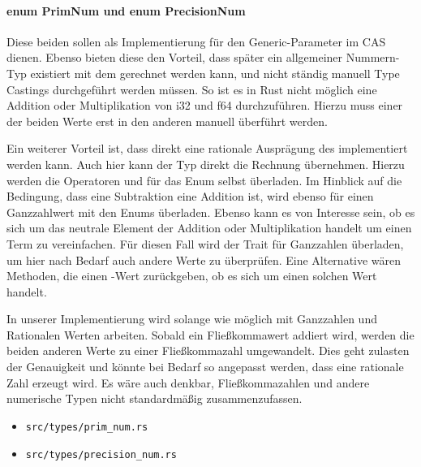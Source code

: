 \documentclass[11pt,a4paper, ngerman]{article}
\begin{document}
\paragraph{enum PrimNum und enum PrecisionNum} Diese beiden  sollen als Implementierung für den Generic-Parameter im CAS dienen. Ebenso bieten diese den Vorteil, dass später ein allgemeiner Nummern-Typ existiert mit dem gerechnet werden kann, und nicht ständig manuell Type Castings durchgeführt werden müssen. So ist es in Rust nicht möglich eine Addition oder Multiplikation von i32 und f64 durchzuführen. Hierzu muss einer der beiden Werte erst in den anderen manuell überführt werden.

Ein weiterer Vorteil ist, dass direkt eine rationale Ausprägung des  implementiert werden kann. Auch hier kann der Typ direkt die Rechnung übernehmen. Hierzu werden die Operatoren  und  für das Enum selbst überladen. Im Hinblick auf die Bedingung, dass eine Subtraktion eine Addition ist, wird ebenso  für einen Ganzzahlwert mit den Enums überladen. Ebenso kann es von Interesse sein, ob es sich um das neutrale Element der Addition oder Multiplikation handelt um einen Term zu vereinfachen. Für diesen Fall wird der Trait  für Ganzzahlen überladen, um hier nach Bedarf auch andere Werte zu überprüfen. Eine Alternative wären Methoden, die einen -Wert zurückgeben, ob es sich um einen solchen Wert handelt.

In unserer Implementierung wird  solange wie möglich mit Ganzzahlen und Rationalen Werten arbeiten. Sobald ein Fließkommawert addiert wird, werden die beiden anderen Werte zu einer Fließkommazahl umgewandelt. Dies geht zulasten der Genauigkeit und könnte bei Bedarf so angepasst werden, dass eine rationale Zahl erzeugt wird. Es wäre auch denkbar, Fließkommazahlen und andere numerische Typen nicht standardmäßig zusammenzufassen.

\begin{itemize}
    \item \begin{verbatim}src/types/prim_num.rs\end{verbatim}
    \item \begin{verbatim}src/types/precision_num.rs\end{verbatim}
\end{itemize}
\end{document}
